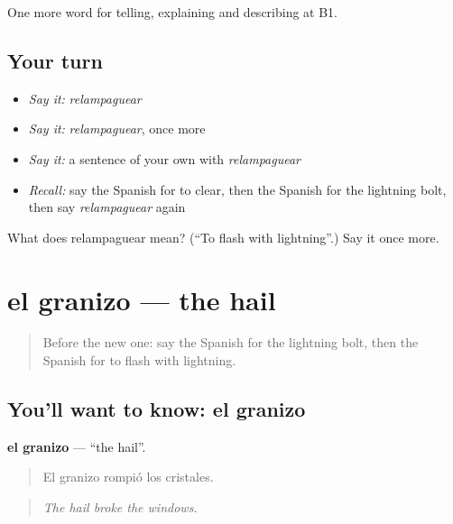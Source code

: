 \begin{grammarlens}[title={What you've built}]
One more word for telling, explaining and describing at B1.
\end{grammarlens}

\subsection*{Your turn}
\begin{itemize}
\raggedright
  \item \emph{Say it:} \emph{relampaguear}
  \item \emph{Say it:} \emph{relampaguear}, once more
  \item \emph{Say it:} a sentence of your own with \emph{relampaguear}
  \item \emph{Recall:} say the Spanish for to clear, then the Spanish for the lightning bolt, then say \emph{relampaguear} again
\end{itemize}

\begin{tcolorbox}[breakable,colback=teal!4,colframe=teal!35!black,title={Before you move on}]
What does relampaguear mean? (\textquotedblleft{}To flash with lightning\textquotedblright{}.) Say it once more.
\end{tcolorbox}
\section[el granizo]{el granizo — the hail}

\label{lesson:ES-C699-granizo}



\begin{quote}
Before the new one: say the Spanish for the lightning bolt, then the Spanish for to flash with lightning.
\end{quote}

\subsection*{You'll want to know: el granizo}
\textbf{el granizo} — \textquotedblleft{}the hail\textquotedblright{}.

\begin{quote}
El granizo rompió los cristales.
\end{quote}

\begin{quote}
\emph{The hail broke the windows.}
\end{quote}

